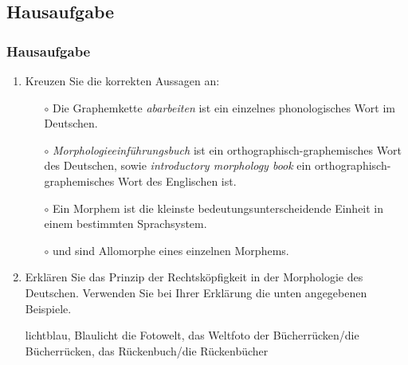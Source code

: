 \subsection{Hausaufgabe}
%
%


\begin{frame}
\frametitle{Hausaufgabe}


\begin{enumerate}
	\item Kreuzen Sie die korrekten Aussagen an: %
	
	\begin{itemize}
		\item[$\circ$] Die Graphemkette \emph{abarbeiten} ist ein einzelnes phonologisches Wort im Deutschen.
		\item[$\circ$] \emph{Morphologieeinführungsbuch} ist ein orthographisch-graphemisches Wort des Deutschen, sowie \emph{introductory morphology book} ein orthographisch-graphemisches Wort des Englischen ist.
		\item[$\circ$] Ein Morphem ist die kleinste bedeutungsunterscheidende Einheit in einem bestimmten Sprachsystem.
		\item[$\circ$]  und  sind Allomorphe eines einzelnen Morphems.
	\end{itemize}
	
	\item Erklären Sie das Prinzip der Rechtsköpfigkeit in der Morphologie des Deutschen. Verwenden Sie bei Ihrer Erklärung die unten angegebenen Beispiele. %
	
	\eal\label{ex:05cHA2}
	\ex\label{ex:05cHA2a} lichtblau, Blaulicht
	\ex\label{ex:05cHA2b} die Fotowelt, das Weltfoto
	\ex\label{ex:05cHA2c} der Bücherrücken/die Bücherrücken, das Rückenbuch/die Rückenbücher
	\zl
\end{enumerate}

\end{frame}



